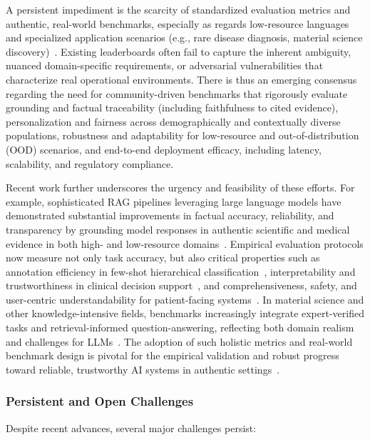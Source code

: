 \documentclass[sigconf]{acmart}
\begin{document}
A persistent impediment is the scarcity of standardized evaluation metrics and authentic, real-world benchmarks, especially as regards low-resource languages and specialized application scenarios (e.g., rare disease diagnosis, material science discovery)~\cite{ref8,ref16,ref20,ref25,ref29,ref32,ref36,ref39,ref40,ref46,ref47,ref48,ref50,ref53,ref54,ref55}. Existing leaderboards often fail to capture the inherent ambiguity, nuanced domain-specific requirements, or adversarial vulnerabilities that characterize real operational environments. There is thus an emerging consensus regarding the need for community-driven benchmarks that rigorously evaluate grounding and factual traceability (including faithfulness to cited evidence), personalization and fairness across demographically and contextually diverse populations, robustness and adaptability for low-resource and out-of-distribution (OOD) scenarios, and end-to-end deployment efficacy, including latency, scalability, and regulatory compliance.

Recent work further underscores the urgency and feasibility of these efforts. For example, sophisticated RAG pipelines leveraging large language models have demonstrated substantial improvements in factual accuracy, reliability, and transparency by grounding model responses in authentic scientific and medical evidence in both high- and low-resource domains~\cite{ref8,ref29,ref53,ref54,ref55}. Empirical evaluation protocols now measure not only task accuracy, but also critical properties such as annotation efficiency in few-shot hierarchical classification~\cite{ref16}, interpretability and trustworthiness in clinical decision support~\cite{ref50,ref53}, and comprehensiveness, safety, and user-centric understandability for patient-facing systems~\cite{ref55}. In material science and other knowledge-intensive fields, benchmarks increasingly integrate expert-verified tasks and retrieval-informed question-answering, reflecting both domain realism and challenges for LLMs~\cite{ref29,ref32}. The adoption of such holistic metrics and real-world benchmark design is pivotal for the empirical validation and robust progress toward reliable, trustworthy AI systems in authentic settings~\cite{ref8,ref32,ref55}.

\subsubsection{Persistent and Open Challenges}

Despite recent advances, several major challenges persist:
\end{document}
